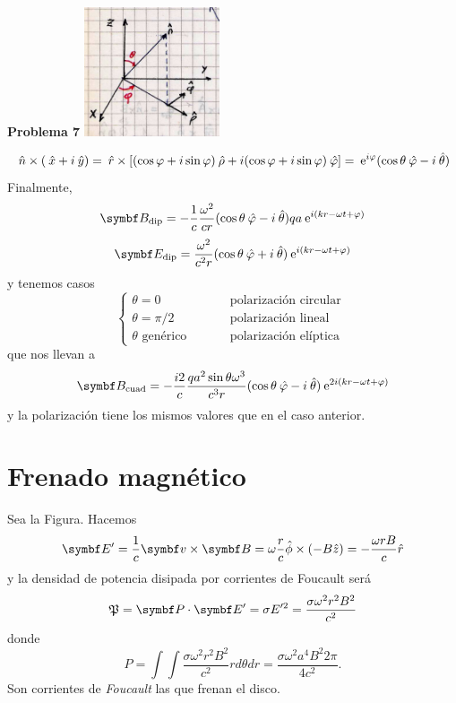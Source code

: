 \documentclass[10pt,oneside]{CBFT_book}
\begin{document}
\begin{ejemplo}{\bf Problema 7}
\includegraphics[width=0.3\textwidth]{images/fig_ft1_versoretes_polares.jpg} 

\[
	\:\hat{n} \times (\:\hat{x} + i\:\hat{y} ) = 
	\:\hat{r} \times [ ( \cos\varphi + i\sin\varphi )\:\hat{\rho} + i( \cos\varphi + i\sin\varphi )\:\hat{\varphi}] =
	\:\mathrm{e}^{i\varphi}(\cos\theta \:\hat{\varphi} - i \:\hat{\theta})
\]
Finalmente,
\[
	\vb{B}_\text{dip} = - \frac{1}{c} \frac{\omega^2}{cr} (\cos\theta \phiver - i \thetaver)
	q a \euler^{i(kr-\omega t+\vp)}
\]
\[
	\vb{E}_\text{dip} = \frac{\omega^2}{c^2r} (\cos\theta \phiver + i \thetaver)
	\euler^{i(kr-\omega t+\vp)}
\]
y tenemos casos
\[
	\begin{cases}
	\theta = 0 \qquad &\text{ polarización circular } \\
	\theta = {\pi}/{2} \qquad &\text{ polarización lineal } \\
	\theta \text{ genérico } \qquad &\text{ polarización elíptica} 
	\end{cases}
\]
que nos llevan a
\[
	\vb{B}_\text{cuad} = - \frac{i2}{c} \frac{qa^2\sin\theta \omega^3}{c^3r} (\cos\theta \phiver - i \thetaver)
	\euler^{2i(kr-\omega t+\vp)}
\]
y la polarización tiene los mismos valores que en el caso anterior.
 
\end{ejemplo}

\section{Frenado magnético}

Sea la Figura. Hacemos
\[
	\vb{E}' = \frac{1}{c}\pv{v}{B} = \omega \frac{r}{c} \hat{\phi} \times (-B\hat{z}) = 
	-\frac{\omega r B}{c} \hat{r}
\]
y la densidad de potencia disipada por corrientes de Foucault será
\[
	\mathfrak{P} = \pe{P}{E'} = \sigma E'^2 = \frac{\sigma \omega^2 r^2 B^2}{c^2}
\]
donde 
\[
	P = \int \int \frac{\sigma \omega^2 r^2 B^2}{c^2} r d\theta dr =
		\frac{\sigma \omega^2 a^4 B^2 2\pi }{4 c^2}.
\]
Son corrientes de {\it Foucault} las que frenan el disco.
\end{document}
